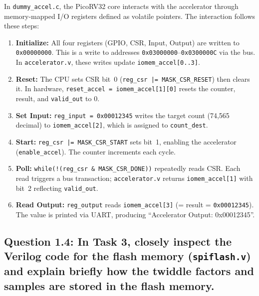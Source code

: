 \documentclass{article}
\begin{document}
\begin{tcolorbox}[colback=white, colframe=black, width=\textwidth, title=Answer 1.3]

In \texttt{dummy\_accel.c}, the PicoRV32 core interacts with the accelerator through memory-mapped I/O registers defined as volatile pointers. The interaction follows these steps:

\vspace{0.2cm}

\begin{enumerate}
\item \textbf{Initialize:} All four registers (GPIO, CSR, Input, Output) are written to \texttt{0x00000000}. This is a write to addresses \texttt{0x03000000}--\texttt{0x0300000C} via the bus. In \texttt{accelerator.v}, these writes update \texttt{iomem\_accel[0..3]}.

\item \textbf{Reset:} The CPU sets CSR bit~0 (\texttt{reg\_csr |= MASK\_CSR\_RESET}) then clears it. In hardware, \texttt{reset\_accel = iomem\_accel[1][0]} resets the counter, result, and \texttt{valid\_out} to 0.

\item \textbf{Set Input:} \texttt{reg\_input = 0x00012345} writes the target count (74{,}565 decimal) to \texttt{iomem\_accel[2]}, which is assigned to \texttt{count\_dest}.

\item \textbf{Start:} \texttt{reg\_csr |= MASK\_CSR\_START} sets bit~1, enabling the accelerator (\texttt{enable\_accel}). The counter increments each cycle.

\item \textbf{Poll:} \texttt{while(!(reg\_csr \& MASK\_CSR\_DONE))} repeatedly reads CSR. Each read triggers a bus transaction; \texttt{accelerator.v} returns \texttt{iomem\_accel[1]} with bit~2 reflecting \texttt{valid\_out}.

\item \textbf{Read Output:} \texttt{reg\_output} reads \texttt{iomem\_accel[3]} (= result = \texttt{0x00012345}). The value is printed via UART, producing ``Accelerator Output: 0x00012345''.
\end{enumerate}

\end{tcolorbox}

\newpage
\subsection*{Question 1.4: In Task 3, closely inspect the Verilog code for the flash memory (\texttt{spiflash.v}) and explain briefly how the twiddle factors and samples are stored in the flash memory.}
\end{document}
